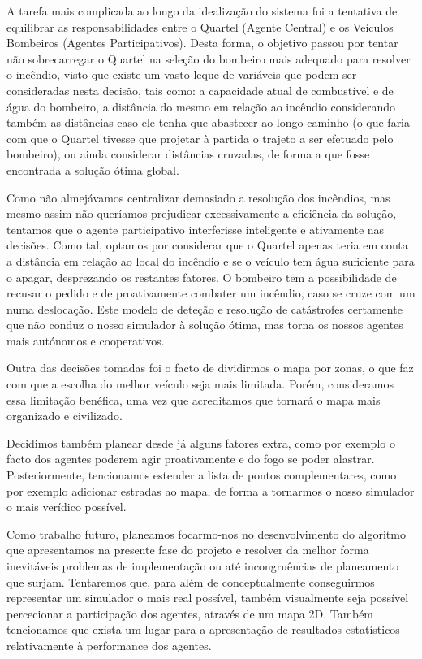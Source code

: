 \documentclass[a4paper]{article}
\begin{document}
A tarefa mais complicada ao longo da idealização do sistema foi a tentativa de equilibrar as responsabilidades entre o Quartel (Agente Central) e os Veículos Bombeiros (Agentes Participativos). Desta forma, o objetivo passou por tentar não sobrecarregar o Quartel na seleção do bombeiro mais adequado para resolver o incêndio, visto que existe um vasto leque de variáveis que podem ser consideradas nesta decisão, tais como: a capacidade atual de combustível e de água do bombeiro, a distância do mesmo em relação ao incêndio considerando também as distâncias caso ele tenha que abastecer ao longo caminho (o que faria com que o Quartel tivesse que projetar à partida o trajeto a ser efetuado pelo bombeiro), ou ainda considerar distâncias cruzadas, de forma a que fosse encontrada a solução ótima global.

Como não almejávamos centralizar demasiado a resolução dos incêndios, mas mesmo assim não queríamos prejudicar excessivamente a eficiência da solução, tentamos que o agente participativo interferisse inteligente e ativamente nas decisões. Como tal, optamos por considerar que o Quartel apenas teria em conta a distância em relação ao local do incêndio e se o veículo tem água suficiente para o apagar, desprezando os restantes fatores. O bombeiro tem a possibilidade de recusar o pedido e de proativamente combater um incêndio, caso se cruze com um numa deslocação. Este modelo de deteção e resolução de catástrofes certamente que não conduz o nosso simulador à solução ótima, mas torna os nossos agentes mais autónomos e cooperativos.

Outra das decisões tomadas foi o facto de dividirmos o mapa por zonas, o que faz com que a escolha do melhor veículo seja mais limitada. Porém, consideramos essa limitação benéfica, uma vez que acreditamos que tornará o mapa mais organizado e civilizado.
	
Decidimos também planear desde já alguns fatores extra, como por exemplo o facto dos agentes poderem agir proativamente e do fogo se poder alastrar. Posteriormente, tencionamos estender a lista de pontos complementares, como por exemplo adicionar estradas ao mapa, de forma a tornarmos o nosso simulador o mais verídico possível.

Como trabalho futuro, planeamos focarmo-nos no desenvolvimento do algoritmo que apresentamos na presente fase do projeto e resolver da melhor forma inevitáveis problemas de implementação ou até incongruências de planeamento que surjam. Tentaremos que, para além de conceptualmente conseguirmos representar um simulador o mais real possível, também visualmente seja possível percecionar a participação dos agentes, através de um mapa 2D. Também tencionamos que exista um lugar para a apresentação de resultados estatísticos relativamente à performance dos agentes.
\end{document}
